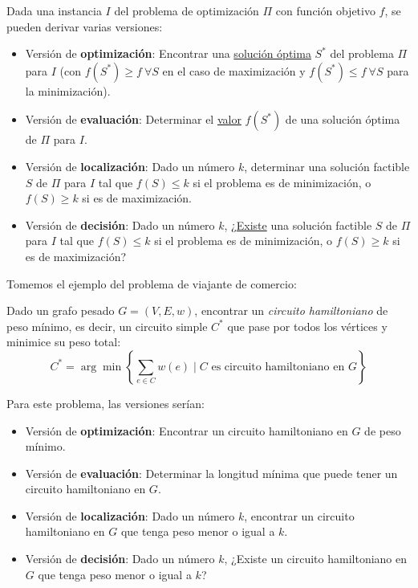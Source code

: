 \documentclass[a4paper]{report}
\begin{document}
Dada una instancia $I$ del problema de optimización $\Pi$ con función objetivo $f$, se pueden derivar varias versiones:
\begin{itemize}
    \item Versión de \textbf{optimización}: Encontrar una \underline{solución óptima} $S^*$ del problema $\Pi$ para $I$ (con $f(S^*) \geq f\ \forall S$ en el caso de maximización y $f(S^*) \le f\ \forall S$ para la minimización).
    \item Versión de \textbf{evaluación}: Determinar el \underline{valor} $f(S^*)$ de una solución óptima de $\Pi$ para $I$.
    \item Versión de \textbf{localización}: Dado un número $k$, determinar una solución factible $S$ de $\Pi$ para $I$ tal que \underline{$f(S) \leq k$} si el problema es de minimización, o $f(S) \geq k$ si es de maximización.
    \item Versión de \textbf{decisión}: Dado un número $k$, ¿\underline{Existe} una solución factible $S$ de $\Pi$ para $I$ tal que $f(S) \leq k$ si el problema es de minimización, o $f(S) \geq k$ si es de maximización?
\end{itemize}

Tomemos el ejemplo del problema de viajante de comercio:

\begin{problema}
    Dado un grafo pesado $G = (V, E, w)$, encontrar un \textit{circuito hamiltoniano} de peso mínimo, es decir, un circuito simple $C^*$ que pase por todos los vértices y minimice su peso total:
    $$C^* = \arg\min\left\{\sum_{e \in C} w(e) \mid C \text{ es circuito hamiltoniano en $G$}\right\}$$
\end{problema}

Para este problema, las versiones serían:
\begin{itemize}
    \item Versión de \textbf{optimización}: Encontrar un circuito hamiltoniano en $G$ de peso mínimo.
    \item Versión de \textbf{evaluación}: Determinar la longitud mínima que puede tener un circuito hamiltoniano en $G$.
    \item Versión de \textbf{localización}: Dado un número $k$, encontrar un circuito hamiltoniano en $G$ que tenga peso menor o igual a $k$.
    \item Versión de \textbf{decisión}: Dado un número $k$, ¿Existe un circuito hamiltoniano en $G$ que tenga peso menor o igual a $k$?
\end{itemize}
\end{document}
